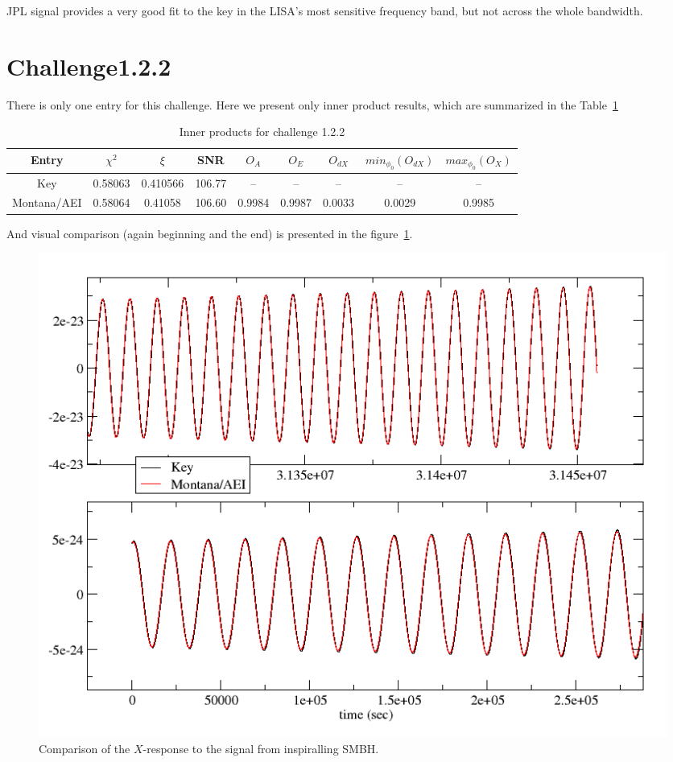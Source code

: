 \documentclass[prd,aps,amsfonts,amsmath, nofootinbib]{revtex4}
\begin{document}
JPL signal provides a very good fit to the key in the LISA's most sensitive frequency band, but not across 
the whole bandwidth.

 
\section{Challenge1.2.2}

There is only one entry for this challenge. Here we present only inner product results, which are summarized in the
Table~\ref{OlapsTable1.2.2}

\begin{table}
\caption{\label{OlapsTable1.2.2} Inner products for challenge 1.2.2}
\begin{ruledtabular}
\begin{tabular}{|c|c|c|c|c|c|c|c|c|}
Entry & $\chi^2$ & $\xi$ & SNR & $O_A$ & $O_E$ & $O_{dX}$ & $min_{\phi_0}(O_{dX})$ & $max_{\phi_0}(O_X)$\\
\hline
Key & 0.58063 & 0.410566 & 106.77 & -- & -- & -- & -- & -- \\
Montana/AEI & 0.58064 & 0.41058 &  106.60 & 0.9984 & 0.9987 & 0.0033 & 0.0029 & 0.9985 \\
\hline
\end{tabular}
\end{ruledtabular}
\end{table}

And visual comparison (again beginning and the end) is presented in the figure~\ref{fig1.2.2}.

\begin{figure}[ht]
\includegraphics[height=0.6\textheight,
keepaspectratio=true,angle=0]{Eval122.png}
\caption{Comparison of the $X$-response to the signal from inspiralling SMBH. }
\label{fig1.2.2}
\end{figure}
\end{document}
